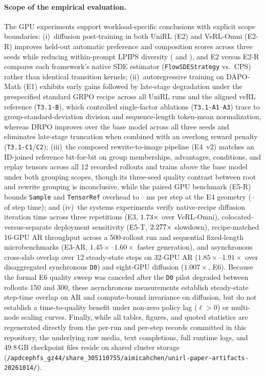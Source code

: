 \documentclass[10pt]{article}
\newcommand{\sample}{\texttt{Sample}}
\newcommand{\codepath}[1]{\texttt{#1}}
\begin{document}
\paragraph{Scope of the empirical evaluation.}
The GPU experiments support workload-specific conclusions with explicit scope boundaries:
(i)~diffusion post-training in both UniRL (E2) and VeRL-Omni (E2-R) improves held-out automatic preference and composition scores across three seeds while reducing within-prompt LPIPS diversity (\ETwoDiversityChange{} and \ETwoRDiversityChange{}), and E2 versus E2-R compares each framework's native SDE estimator (\texttt{FlowSDEStrategy} vs.\ CPS) rather than identical transition kernels;
(ii)~autoregressive training on DAPO-Math (E1) exhibits early gains followed by late-stage degradation under the prespecified standard GRPO recipe across all UniRL runs and the aligned veRL reference (\texttt{T3.1-B}), which controlled single-factor ablations (\texttt{T3.1-A1}--\texttt{A3}) trace to group-standard-deviation division and sequence-length token-mean normalization, whereas DRPO improves over the base model across all three seeds and eliminates late-stage truncation when combined with an overlong reward penalty (\texttt{T3.1-C1}/\texttt{C2});
(iii)~the composed rewrite-to-image pipeline (E4~v2) matches an ID-joined reference bit-for-bit on group memberships, advantages, conditions, and replay tensors across all 12 recorded rollouts and trains above the base model under both grouping scopes, though its three-seed quality contrast between root and rewrite grouping is inconclusive, while the paired GPU benchmark (E5-R) bounds \sample{} and \texttt{TensorRef} overhead to \EFiveRTreeEExactSameTotalMs{}--\EFiveRTreeEExactCrossTotalMs{}\,ms per step at the E4 geometry (\EFiveRTreeEExactPctSixtyFour{}--\EFiveRTreeEExactCrossPctTwentyNine{} of step time); and
(iv)~the systems experiments verify native-recipe diffusion iteration time across three repetitions (E3, $1.73{}\times$ over VeRL-Omni), colocated-versus-separate deployment sensitivity (E5-T, $2.277{}\times$ slowdown), recipe-matched 16-GPU AR throughput across a 500-rollout run and sequential fixed-length microbenchmarks (E3-AR, $1.45\times$--$1.60\times$ faster generation), and asynchronous cross-slab overlap over 12 steady-state steps on 32-GPU AR ($1.85\times$--$1.91\times$ over disaggregated synchronous \texttt{D0}) and eight-GPU diffusion ($1.007\times$, E6).
Because the formal E6 quality sweep was canceled after the \texttt{D0} pilot degraded between rollouts 150 and 300, these asynchronous measurements establish steady-state step-time overlap on AR and compute-bound invariance on diffusion, but do not establish a time-to-quality benefit under non-zero policy lag ($\ell > 0$) or multi-node scaling curves.
Finally, while all tables, figures, and quoted statistics are regenerated directly from the per-run and per-step records committed in this repository, the underlying raw media, text completions, full runtime logs, and 49.8\,GB checkpoint files reside on shared cluster storage (\codepath{/apdcephfs\_gz44/share\_305110755/aimicahchen/unirl-paper-artifacts-20261014/}).
\end{document}
